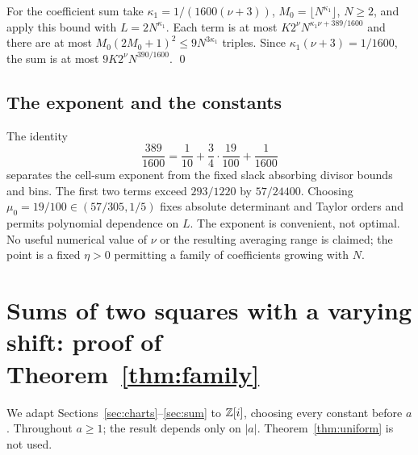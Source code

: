 \documentclass[11pt,reqno]{amsart}
\theoremstyle{definition}
\theoremstyle{remark}
\numberwithin{equation}{section}
\begin{document}
For the coefficient sum take $\kappa_1=1/(1600(\nu+3))$,
$M_0=\lfloor N^{\kappa_1}\rfloor$, $N\ge2$, and apply this bound
with $L=2N^{\kappa_1}$. Each term is at most
$K2^\nu N^{\kappa_1\nu+389/1600}$ and there are at most
$M_0(2M_0+1)^2\le9N^{3\kappa_1}$ triples. Since
$\kappa_1(\nu+3)=1/1600$, the sum is at most
$9K2^\nu N^{390/1600}$. \qed

\subsection{The exponent and the constants}\label{sec:A3remarks}
The identity
\[
 \frac{389}{1600}=\frac1{10}+\frac34\cdot\frac{19}{100}+\frac1{1600}
\]
separates the cell-sum exponent from the fixed slack absorbing divisor
bounds and bins. The first two terms exceed $293/1220$ by $57/24400$.
Choosing $\mu_0=19/100\in(57/305,1/5)$ fixes absolute determinant
and Taylor orders and permits polynomial dependence on $L$.
The exponent is convenient, not optimal. No useful numerical value of
$\nu$ or the resulting averaging range is claimed; the point is a fixed
$\eta>0$ permitting a family of coefficients growing with $N$.
\section{Sums of two squares with a varying shift: proof of Theorem~\ref{thm:family}}\label{sec:A2}
We adapt Sections~\ref{sec:charts}--\ref{sec:sum} to $\mathbb Z[i]$, choosing
every constant before $a$. Throughout $a\ge1$; the result depends only
on $|a|$. Theorem~\ref{thm:uniform} is not used.
\end{document}
